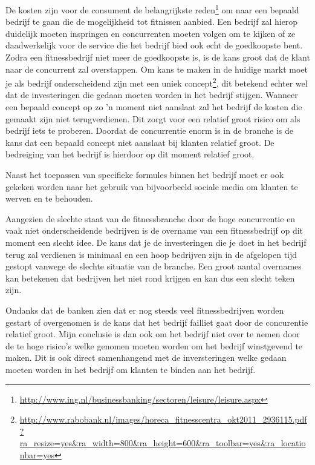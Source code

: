 De kosten zijn voor de consument de belangrijkste reden\footnote{\url{http://www.ing.nl/businessbanking/sectoren/leisure/leisure.aspx}} om naar een bepaald bedrijf te gaan die de mogelijkheid tot fitnissen aanbied. Een bedrijf zal hierop duidelijk moeten inspringen en concurrenten moeten volgen om te kijken of ze daadwerkelijk voor de service die het bedrijf bied ook echt de goedkoopste bent. Zodra een fitnessbedrijf niet meer de goedkoopste is, is de kans groot dat de klant naar de concurrent zal overstappen. Om kans te maken in de huidige markt moet je als bedrijf onderscheidend zijn met een uniek concept\footnote{\url{http://www.rabobank.nl/images/horeca_fitnesscentra_okt2011_2936115.pdf?ra_resize=yes&ra_width=800&ra_height=600&ra_toolbar=yes&ra_locationbar=yes}}, dit betekend echter wel dat de investeringen die gedaan moeten worden in het bedrijf stijgen. Wanneer een bepaald concept op zo 'n moment niet aanslaat zal het bedrijf de kosten die gemaakt zijn niet terugverdienen. Dit zorgt voor een relatief groot risico om als bedrijf iets te proberen. Doordat de concurrentie enorm is in de branche is de kans dat een bepaald concept niet aanslaat bij klanten relatief groot. De bedreiging van het bedrijf is hierdoor op dit moment relatief groot.  

Naast het toepassen van specifieke formules binnen het bedrijf moet er ook gekeken worden naar het gebruik van bijvoorbeeld sociale media om klanten te werven en te behouden. 

Aangezien de slechte staat van de fitnessbranche door de hoge concurrentie en vaak niet onderscheidende bedrijven is de overname van een fitnessbedrijf op dit moment een slecht idee. De kans dat je de investeringen die je doet in het bedrijf terug zal verdienen is minimaal en een hoop bedrijven zijn in de afgelopen tijd gestopt vanwege de slechte situatie van de branche. Een groot aantal overnames kan betekenen dat bedrijven het niet rond krijgen en kan dus een slecht teken zijn.

Ondanks dat de banken zien dat er nog steeds veel fitnessbedrijven worden gestart of overgenomen is de kans dat het bedrijf failliet gaat door de concurentie relatief groot. Mijn conclusie is dan ook om het bedrijf niet over te nemen door de te hoge risico's welke genomen moeten worden om het bedrijf winstgevend te maken. Dit is ook direct samenhangend met de inversteringen welke gedaan moeten worden in het bedrijf om klanten te binden aan het bedrijf.
        
 
